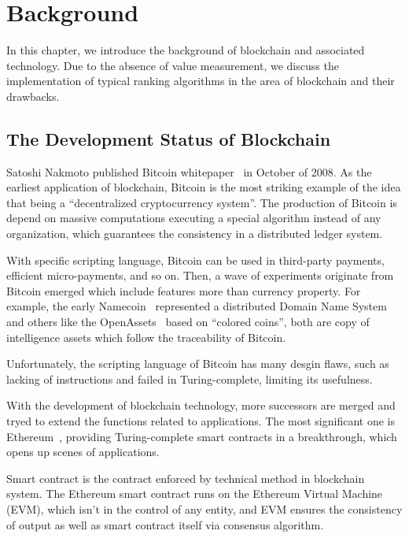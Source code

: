 
\section{Background}
In this chapter, we introduce the background of blockchain and associated technology. Due to the absence of value measurement, we discuss the implementation of typical ranking algorithms in the area of blockchain and their drawbacks.

\subsection{The Development Status of Blockchain}

Satoshi Nakmoto published Bitcoin whitepaper~\cite{Nakamoto2008} in October of 2008. As the earliest application of blockchain, Bitcoin is the most striking example of the idea that being a “decentralized cryptocurrency system”. The production of Bitcoin is depend on massive computations executing a special algorithm instead of any organization, which guarantees the consistency in a distributed ledger system.

With specific scripting language, Bitcoin can be used in third-party payments, efficient micro-payments, and so on. Then, a wave of experiments originate from Bitcoin emerged which include features more than currency property. For example, the early Namecoin~\cite{Namecoin} represented a distributed Domain Name System and others like the OpenAssets~\cite{OpenAssets} based on “colored coins”, both are copy of intelligence assets which follow the traceability of Bitcoin.

Unfortunately, the scripting language of Bitcoin has many desgin flaws, such as lacking of instructions and failed in Turing-complete, limiting its usefulness.

With the development of blockchain technology, more successors are merged and tryed to extend the functions related to applications. The most significant one is Ethereum~\cite{buterin2013ethereum}, providing Turing-complete smart contracts in a breakthrough, which opens up scenes of applications.

Smart contract is the contract enforced by technical method in blockchain system. The Ethereum smart contract runs on the Ethereum Virtual Machine (EVM), which isn't in the control of any entity, and EVM ensures the consistency of output as well as smart contract itself via consensus algorithm.

